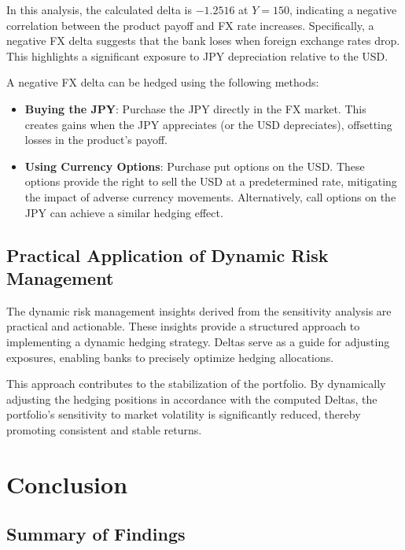 \documentclass[a4paper, twocolumn]{article}
\begin{document}
In this analysis, the calculated delta is $-1.2516$ at $Y = 150$, indicating a negative correlation between the product payoff and FX rate increases. Specifically, a negative FX delta suggests that the bank loses when foreign exchange rates drop. This highlights a significant exposure to JPY depreciation relative to the USD.

A negative FX delta can be hedged using the following methods:

\begin{itemize}

    \item \textbf{Buying the JPY}: Purchase the JPY directly in the FX market. This creates gains when the JPY appreciates (or the USD depreciates), offsetting losses in the product's payoff.

    \item \textbf{Using Currency Options}: Purchase put options on the USD. These options provide the right to sell the USD at a predetermined rate, mitigating the impact of adverse currency movements. Alternatively, call options on the JPY can achieve a similar hedging effect.

\end{itemize}

\subsection{Practical Application of Dynamic Risk Management}

The dynamic risk management insights derived from the sensitivity analysis are practical and actionable. These insights provide a structured approach to implementing a dynamic hedging strategy. Deltas serve as a guide for adjusting exposures, enabling banks to precisely optimize hedging allocations.

This approach contributes to the stabilization of the portfolio. By dynamically adjusting the hedging positions in accordance with the computed Deltas, the portfolio's sensitivity to market volatility is significantly reduced, thereby promoting consistent and stable returns.

\section{Conclusion}

\subsection{Summary of Findings}
\end{document}
